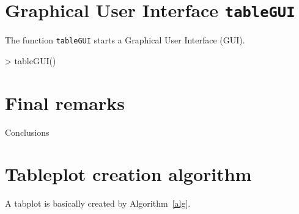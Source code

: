 \documentclass[11pt, fleqn, a4paper]{article}
\begin{document}
\section{Graphical User Interface {\tt tableGUI}}
The function {\tt tableGUI} starts a Graphical User Interface (GUI).
\begin{Schunk}
\begin{Sinput}
> tableGUI()
\end{Sinput}
\end{Schunk}




\section{Final remarks}
Conclusions





\appendix
\newpage
\section{Tableplot creation algorithm}\label{secalg}
A tabplot is basically created by Algorithm~\ref{alg}.
\end{document}
